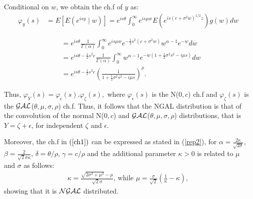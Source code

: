 \documentclass[12pt,a4paper]{article}\usepackage[]{graphicx}\usepackage[]{color}\usepackage{subfigure}
\begin{document}
Conditional on $w$, we obtain the ch.f of $y$ as: 
\begin{align}
\varphi_y(s) &= E\left[E\left(e^{isy}\mid w\right)\right] = e^{is\theta}\int_0^\infty{e^{is\mu w}E\left(e^{is(c+\sigma^2 w)^{1/2}z}\right)}g(w)dw\nonumber
\end{align}

\begin{align}
& = e^{is\theta}\frac{1}{\Gamma(\alpha)}\int_0^\infty{e^{is\mu w}e^{-\frac{1}{2}s^2(c+\sigma^2w)}{w}^{\alpha-1} e^{-w}dw}\nonumber\\
& = e^{is\theta-\frac{1}{2}s^2c}\frac{1}{\Gamma(\alpha)}\int_0^\infty{w^{\alpha-1}e^{-w\left(1+\frac{1}{2}\sigma^2 s^2-i\mu s\right)}dw}\nonumber\\
& = e^{is\theta-\frac{1}{2}s^2c}\left(\frac{1}{1+\frac{1}{2}\sigma^2 s^2-i\mu s}\right)^{\rho}.\label{ch1}
\end{align}

Thus, $\varphi_Y(s) = \varphi_\epsilon(s).\varphi_\zeta(s),$ where $\varphi_\epsilon(s)$ is the N($0,c$) ch.f and $\varphi_\zeta(s)$ is the $\cal{GAL}$($\theta,\mu,\sigma,\rho$) ch.f. 
Thus, it follows that the NGAL distribution is that of the convolution of the normal N($0,c$) and $\cal{GAL}$($\theta,\mu,\sigma,\rho$) distributions, that is $Y=\zeta + \epsilon$, for independent $\zeta$ and $\epsilon$. 


Moreover, the ch.f in $(\ref{ch1})$ can be expressed as stated in (\ref{rep2}), for $\alpha=\frac{2\kappa}{\sqrt{2\sigma}}$, $\beta=\frac{2}{\sqrt{2}\sigma\kappa}$, $\delta=\theta/\rho$, $\gamma=c/\rho$ and the additional parameter $\kappa>0$ is related to $\mu$ and $\sigma$ as follows:
\begin{align*}
\kappa = \frac{\sqrt{2\sigma^2 +\mu^2}-\mu}{\sqrt{2}\sigma} \mbox{, while } \mu=\frac{\sigma}{\sqrt{2}}\left(\frac{1}{\kappa}-\kappa\right),
\end{align*}
showing that it is $\cal{NGAL}$ distributed.
 
\end{document}
